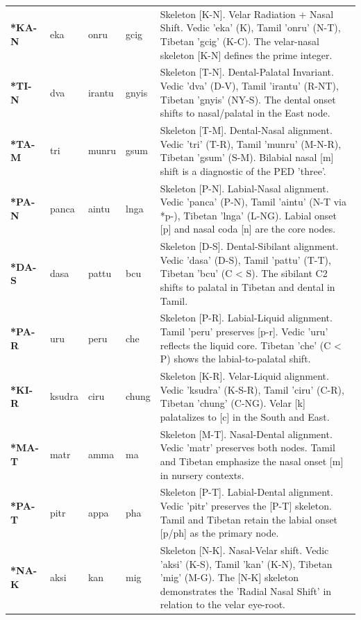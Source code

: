 \begin{longtable}{p{} p{} p{} p{} p{}}
\addlinespace[10pt]
\textbf{*KA-N} & eka & onru & gcig & \small Skeleton [K-N]. Velar Radiation + Nasal Shift. Vedic 'eka' (K), Tamil 'onru' (N-T), Tibetan 'gcig' (K-C). The velar-nasal skeleton [K-N] defines the prime integer. \\ 
\addlinespace[10pt]
\textbf{*TI-N} & dva & irantu & gnyis & \small Skeleton [T-N]. Dental-Palatal Invariant. Vedic 'dva' (D-V), Tamil 'irantu' (R-NT), Tibetan 'gnyis' (NY-S). The dental onset shifts to nasal/palatal in the East node. \\ 
\addlinespace[10pt]
\textbf{*TA-M} & tri & munru & gsum & \small Skeleton [T-M]. Dental-Nasal alignment. Vedic 'tri' (T-R), Tamil 'munru' (M-N-R), Tibetan 'gsum' (S-M). Bilabial nasal [m] shift is a diagnostic of the PED 'three'. \\ 
\addlinespace[10pt]
\textbf{*PA-N} & panca & aintu & lnga & \small Skeleton [P-N]. Labial-Nasal alignment. Vedic 'panca' (P-N), Tamil 'aintu' (N-T via *p-), Tibetan 'lnga' (L-NG). Labial onset [p] and nasal coda [n] are the core nodes. \\ 
\addlinespace[10pt]
\textbf{*DA-S} & dasa & pattu & bcu & \small Skeleton [D-S]. Dental-Sibilant alignment. Vedic 'dasa' (D-S), Tamil 'pattu' (T-T), Tibetan 'bcu' (C < S). The sibilant C2 shifts to palatal in Tibetan and dental in Tamil. \\ 
\addlinespace[10pt]
\textbf{*PA-R} & uru & peru & che & \small Skeleton [P-R]. Labial-Liquid alignment. Tamil 'peru' preserves [p-r]. Vedic 'uru' reflects the liquid core. Tibetan 'che' (C < P) shows the labial-to-palatal shift. \\ 
\addlinespace[10pt]
\textbf{*KI-R} & ksudra & ciru & chung & \small Skeleton [K-R]. Velar-Liquid alignment. Vedic 'ksudra' (K-S-R), Tamil 'ciru' (C-R), Tibetan 'chung' (C-NG). Velar [k] palatalizes to [c] in the South and East. \\ 
\addlinespace[10pt]
\textbf{*MA-T} & matr & amma & ma & \small Skeleton [M-T]. Nasal-Dental alignment. Vedic 'matr' preserves both nodes. Tamil and Tibetan emphasize the nasal onset [m] in nursery contexts. \\ 
\addlinespace[10pt]
\textbf{*PA-T} & pitr & appa & pha & \small Skeleton [P-T]. Labial-Dental alignment. Vedic 'pitr' preserves the [P-T] skeleton. Tamil and Tibetan retain the labial onset [p/ph] as the primary node. \\ 
\addlinespace[10pt]
\textbf{*NA-K} & aksi & kan & mig & \small Skeleton [N-K]. Nasal-Velar shift. Vedic 'aksi' (K-S), Tamil 'kan' (K-N), Tibetan 'mig' (M-G). The [N-K] skeleton demonstrates the 'Radial Nasal Shift' in relation to the velar eye-root. \\ 

\end{longtable}
